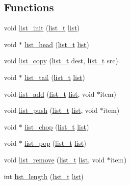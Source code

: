 \subsection*{Functions}
\begin{DoxyCompactItemize}
\item 
void \hyperlink{group__list_ga10fe9694aceedc8308cc543b9b95d9c9}{list\+\_\+init} (\hyperlink{group__list_ga9c248916bae1f0b13732686786be7108}{list\+\_\+t} \hyperlink{structlist}{list})
\item 
void $\ast$ \hyperlink{group__list_gacc0723982dcfcc54cfa6ba932ee63051}{list\+\_\+head} (\hyperlink{group__list_ga9c248916bae1f0b13732686786be7108}{list\+\_\+t} \hyperlink{structlist}{list})
\item 
void \hyperlink{group__list_ga89eaee4d473383726c7899f70d244cfe}{list\+\_\+copy} (\hyperlink{group__list_ga9c248916bae1f0b13732686786be7108}{list\+\_\+t} dest, \hyperlink{group__list_ga9c248916bae1f0b13732686786be7108}{list\+\_\+t} src)
\item 
void $\ast$ \hyperlink{group__list_ga4e96242bd922c2c7116b2e5a5ca7011b}{list\+\_\+tail} (\hyperlink{group__list_ga9c248916bae1f0b13732686786be7108}{list\+\_\+t} \hyperlink{structlist}{list})
\item 
void \hyperlink{group__list_ga775c0dfc08dca991297df7b419b7be43}{list\+\_\+add} (\hyperlink{group__list_ga9c248916bae1f0b13732686786be7108}{list\+\_\+t} \hyperlink{structlist}{list}, void $\ast$item)
\item 
void \hyperlink{group__list_gaaa39517a2e9ec81c34e4740d43ea7150}{list\+\_\+push} (\hyperlink{group__list_ga9c248916bae1f0b13732686786be7108}{list\+\_\+t} \hyperlink{structlist}{list}, void $\ast$item)
\item 
void $\ast$ \hyperlink{group__list_ga34e6b487c378343356299f048f8011ad}{list\+\_\+chop} (\hyperlink{group__list_ga9c248916bae1f0b13732686786be7108}{list\+\_\+t} \hyperlink{structlist}{list})
\item 
void $\ast$ \hyperlink{group__list_ga846aef3d9db78d0755e6bb39e7da485e}{list\+\_\+pop} (\hyperlink{group__list_ga9c248916bae1f0b13732686786be7108}{list\+\_\+t} \hyperlink{structlist}{list})
\item 
void \hyperlink{group__list_ga3eb717d9997a980e937e2ea8b0c07677}{list\+\_\+remove} (\hyperlink{group__list_ga9c248916bae1f0b13732686786be7108}{list\+\_\+t} \hyperlink{structlist}{list}, void $\ast$item)
\item 
int \hyperlink{group__list_ga96f2c18e2a603b297e3c1cae6198dcca}{list\+\_\+length} (\hyperlink{group__list_ga9c248916bae1f0b13732686786be7108}{list\+\_\+t} \hyperlink{structlist}{list})

\end{DoxyCompactItemize}
